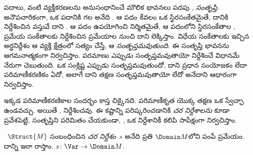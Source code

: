 \documentclass[../../../include/open-logic-section]{subfiles}
\begin{document}


\begin{explain}
పదాలు,  వంటి వ్యక్తీకరణలను  అనుసంధానించే
మౌలిక భావనలు పదపు \emph{},  \emph{సంతృప్తి}. అనౌపచారికంగా,
ఒక పదానికి గల  అనేది  . ఆ పదం
కేవలం ఒక స్థిరసంకేతమైతే, దానికి  నిర్దేశించిన వస్తువే దాని
. ఆ పదం  ఉపయోగించి నిర్మితమైతే, ఆ పదంలోని
స్థిరసంకేతాల , ప్రమేయ సంకేతాలకు నిర్దేశించిన ప్రమేయాల నుంచి
దాని  లెక్కిస్తాం. విధేయ సంకేతాలకు ఇచ్చిన అర్థనిర్దేశం ఆ
  వ్యక్తి క్షేత్రంలో సత్యం చేస్తే,
 ఆ  \emph{సంతృప్తమవుతుంది}. ఈ సంతృప్తి
భావనను ఆగమనాత్మకంగా నిర్వచిస్తాం. పరమాణు  ఎప్పుడు
సంతృప్తమవుతాయో  నిర్దేశించే విధానమే నేరుగా చెబుతుంది. ఒక
సంక్లిష్ట  ఎప్పుడు సంతృప్తమవుతుందో, దాని ప్రధాన సంయోజకం లేదా
పరిమాణీకరణికం ఏదో, అలాగే దాని తక్షణ  సంతృప్తమవుతాయో లేదో అనేదాని
ఆధారంగా నిర్వచిస్తాం.

ఇక్కడ పరిమాణీకరణికాల సందర్భం కాస్త చిక్కైనది. పరిమాణీకృత 
యొక్క తక్షణ  ఒక స్వేచ్ఛా  ఉండవచ్చు. అయితే
,   నిర్దేశించవు. ఈ
కష్టాన్ని పరిష్కరించడానికి \emph{చర నిర్దేశాలను} కూడా ప్రవేశపెట్టి,
సంతృప్తిని  పరిమితం చేయకుండా, ,
ఒక  నిర్దేశానికీ కలిపి సాపేక్షంగా నిర్వచిస్తాం.
\end{explain}

\begin{defn}[చర నిర్దేశం]
~$\Struct{M}$ సంబంధించిన \emph{చర నిర్దేశం}~$s$ అనేది ప్రతి
 $\Domain M$లోని  పంపే ప్రమేయం. దాన్ని ఇలా రాస్తాం.
$s\colon \Var \to \Domain M$.
\end{defn}
\end{document}
